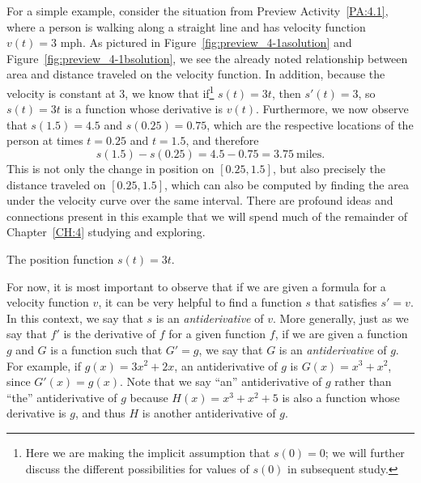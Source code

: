 For a simple example, consider the situation from Preview Activity~\ref{PA:4.1}, where a person is walking along a straight line and has velocity function $v(t) = 3$ mph.
As pictured in Figure~\ref{fig:preview_4-1asolution} and Figure~\ref{fig:preview_4-1bsolution}, we see the already noted relationship between area and distance traveled on the velocity function.  In addition, because the velocity is constant at 3, we know that if\footnote{Here we are making the implicit assumption that $s(0) = 0$; we will further discuss the different possibilities for values of $s(0)$ in subsequent study.} $s(t) = 3t$, then $s'(t) = 3$, so $s(t) = 3t$ is a function whose derivative is $v(t)$.  Furthermore, we now observe that $s(1.5) = 4.5$ and $s(0.25) = 0.75$, which are the respective locations of the person at times $t = 0.25$ and $t = 1.5$, and therefore
\[ s(1.5) - s(0.25) = 4.5 - 0.75 = 3.75 \ \mbox{miles}. \]
This is not only the change in position on $[0.25,1.5]$, but also precisely the distance traveled on $[0.25,1.5]$, which can also be computed by finding the area under the velocity curve over the same interval.  There are profound ideas and connections present in this example that we will spend much of the remainder of Chapter~\ref{CH:4} studying and exploring.

\begin{marginfigure}[0cm] %
\caption{The position function $s(t) = 3t$.} \label{fig:preview_4-1bsolution}
\end{marginfigure}

For now, it is most important to observe that if we are given a formula for a velocity function $v$, it can be very helpful to find a function $s$ that satisfies $s' = v$.  In this context, we say that $s$ is an \emph{antiderivative} of $v$.  More generally, just as we say that $f'$ is the derivative of $f$ for a given function $f$, if we are given a function $g$ and $G$ is a function such that $G' = g$, we say that $G$ is an \emph{antiderivative}  of $g$.  For example, if $g(x) = 3x^2 + 2x$, an antiderivative of $g$ is $G(x) = x^3 + x^2$, since $G'(x) = g(x)$.  Note that we say ``an'' antiderivative of $g$ rather than ``the'' antiderivative of $g$ because $H(x) = x^3 + x^2 + 5$ is also a function whose derivative is $g$, and thus $H$ is another antiderivative of $g$.  


